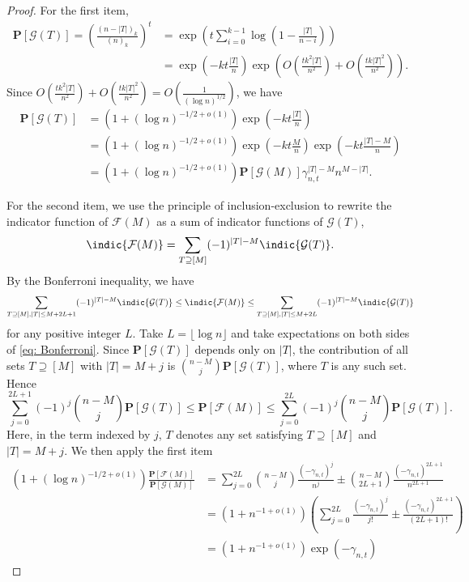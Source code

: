 \begin{proof}
For the first item,
\begin{equation}
\begin{aligned}
        \mathbf{P}[\mathcal{G}(T)] = \left(\frac{(n-|T|)_k}{(n)_k}\right)^{t} &= \exp\left(t\sum_{i=0}^{k-1}\log\left(1-\frac{|T|}{n-i}\right)\right)\\
        &= \exp\left(-kt\frac{|T|}{n}\right)\exp\left(O\left(\frac{tk^2|T|}{n^2}\right)+O\left(\frac{tk|T|^2}{n^2}\right)\right).
\end{aligned}
\end{equation}
Since $O\left(\frac{tk^2|T|}{n^2}\right) + O\left(\frac{tk|T|^2}{n^2}\right)=O\left(\frac{1}{(\log n)^{1/2}}\right)$, we have
\begin{equation}
\begin{aligned}
        \mathbf{P}[\mathcal{G}(T)]
        &= (1+(\log n)^{-1/2+o(1)})\exp\left(-kt\frac{|T|}{n}\right)\\
        &= (1+(\log n)^{-1/2+o(1)})\exp\left(-kt\frac{M}{n}\right)\exp\left(-kt\frac{|T|-M}{n}\right)\\
        &=  (1+(\log n)^{-1/2+o(1)})\mathbf{P}[\mathcal{G}(M)]\gamma_{n,t}^{|T|-M}n^{M-|T|}.
\end{aligned}
\end{equation}

For the second item, we use the principle of inclusion-exclusion to rewrite the indicator function of $\mathcal{F}(M)$ as a sum of indicator functions of $\mathcal{G}(T)$,
\begin{equation}
    \indic \{\mathcal{F}(M)\} = \sum_{T \supseteq [M]} (-1)^{|T| - M} \indic \{\mathcal{G}(T)\}.
\end{equation}
By the Bonferroni inequality, we have
\begin{equation}\label{eq: Bonferroni}
\sum_{T \supseteq [M], |T| \leq M + 2L +1} (-1)^{|T| - M} \indic \{\mathcal{G}(T)\} \leq \indic\{\mathcal{F}(M)\} \leq \sum_{T \supseteq [M], |T| \leq M + 2L} (-1)^{|T| - M} \indic \{\mathcal{G}(T)\}
\end{equation}
for any positive integer $L$. Take \(L=\lfloor\log n\rfloor\) and take expectations on both sides of \eqref{eq: Bonferroni}. Since \(\mathbf P[\mathcal G(T)]\) depends only on \(|T|\), the contribution of all sets \(T\supseteq[M]\) with \(|T|=M+j\) is
\(\binom{n-M}{j}\mathbf P[\mathcal G(T)]\), where \(T\) is any such set. Hence
$$
\sum_{j=0}^{2L+1}
(-1)^j
\binom{n-M}{j}
\mathbf P[\mathcal G(T)]
\leq
\mathbf P[\mathcal F(M)]
\leq
\sum_{j=0}^{2L}
(-1)^j
\binom{n-M}{j}
\mathbf P[\mathcal G(T)].
$$
Here, in the term indexed by \(j\), \(T\) denotes any set satisfying \(T\supseteq[M]\) and \(|T|=M+j\).
We then apply the first item
\[
\begin{aligned}
(1+(\log n)^{-1/2+o(1)})\frac{\mathbf{P}[\mathcal{F}(M)]}{\mathbf{P}[\mathcal{G}(M)]} &= \sum_{j=0}^{2L} \binom{n-M}{j}\frac{(-\gamma_{n,t})^j}{n^j} \pm  \binom{n-M}{2L+1}\frac{(-\gamma_{n,t})^{2L+1}}{n^{2L+1}}\\
&=(1+n^{-1+o(1)})\left(\sum_{j=0}^{2L} \frac{(-\gamma_{n,t})^j}{j!} \pm \frac{(-\gamma_{n,t})^{2L+1}}{(2L+1)!}  \right)\\
&= (1+n^{-1+o(1)})\exp(-\gamma_{n,t})
\end{aligned}
\]


\end{proof}
